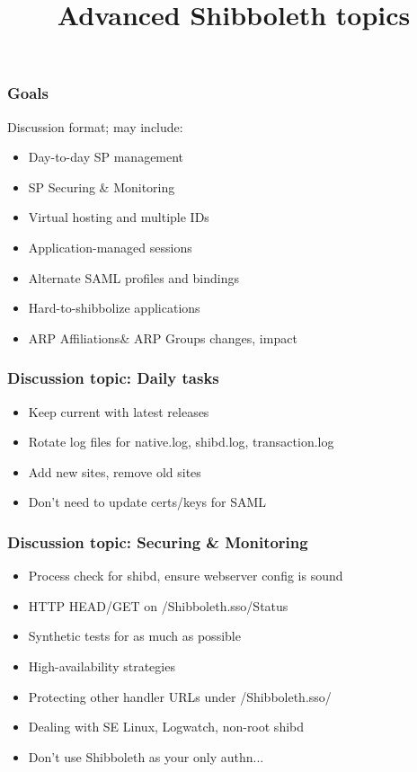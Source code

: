 


\title[Advanced Shibboleth Bootcamp]{Advanced Shibboleth topics}

\begin{frame}
\frametitle{Goals}

Discussion format; may include:
\begin{itemize}
\item Day-to-day SP management
\item SP Securing \& Monitoring
\item Virtual hosting and multiple IDs
\item Application-managed sessions
\item Alternate SAML profiles and bindings
\item Hard-to-shibbolize applications
\item ARP Affiliations\& ARP Groups changes, impact
\end{itemize}
\end{frame}

\begin{frame}
\frametitle{Discussion topic: Daily tasks}
\begin{itemize}
\item Keep current with latest releases 
\item Rotate log files for native.log, shibd.log, transaction.log 
\item Add new sites, remove old sites 
\item Don't need to update certs/keys for SAML
\end{itemize}
\end{frame}

\begin{frame}
\frametitle{Discussion topic: Securing \& Monitoring}
\begin{itemize}
\item Process check for shibd, ensure webserver config is sound
\item HTTP HEAD/GET on /Shibboleth.sso/Status 
\item Synthetic tests for as much as possible 
\item High-availability strategies
\item Protecting other handler URLs under /Shibboleth.sso/ 
\item Dealing with SE Linux, Logwatch, non-root shibd
\item Don’t use Shibboleth as your only authn...
\end{itemize}
\end{frame}

